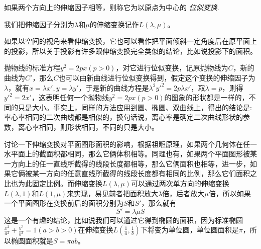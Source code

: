 如果两个方向上的伸缩因子相等，则称它为以原点为中心的 \emph{位似变换}.

我们把伸缩因子分别为$\lambda$和$\mu$的伸缩变换记作$L(\lambda, \mu)$。

如果以空间的视角来看伸缩变换，它也可以看作把平面倾斜一定角度后在原平面上的投影，所以关于投影有许多跟伸缩变换完全类似的结论，比如说投影下的面积。

\begin{example}[二次曲线的离心率决定其形状]
  抛物线的标准方程$y^2=2px(p>0)$，对它进行位似变换，记原抛物线为$C$，新的曲线为$C'$，那么$C$也可以由新曲线进行位似变换得到，假定这个变换的伸缩因子为$\lambda$，就有$x=\lambda x', y=\lambda y'$，于是新的曲线方程是$\lambda^2y'^2=2p\lambda x'$，取$\lambda = p$，则得$y'^2=2x'$，这表明任何一个抛物线$y^2=2px(p>0)$的图象的形状都是一样的，不同的只是大小。事实上，同样的方法应用到圆、椭圆、双曲线上，得出的结论是: 率心率相同的二次曲线都是相似的，换句话说，离心率是确定二次曲线形状的参数，离心率相同，则形状相同，不同的只是大小。
\end{example}

\begin{example}
  讨论一下伸缩变换对平面图形面积的影响，根据祖暅原理，如果两个几何体在任一水平面上的截面积都相同，那么它俩体积相等。同理也有，如果两个平面图形被某一方向上的任一直线所截得的线段长度都相等，那么它俩面积也相等，进一步，如果它俩被某一方向的任意直线所截得的线段长度都有相同的比例，那么它们面积之比也为此固定比例。而伸缩变换$L(\lambda, \mu)$可以通过两次单方向的伸缩变换$L(\lambda, 1)$和$L(1, \mu)$来实现，易见前者把面积放大$\lambda$倍，后者放大$\mu$倍，所以如果一个平面图形在变换前后的面积分别为$S$和$S'$，那么就有
  \begin{equation}
    \label{eq:area-for-scale-translation}
  S'=\lambda \mu S
  \end{equation}
这是一个有趣的结论，比如说我们可以通过它得到椭圆的面积，因为标准椭圆$\frac{x^2}{a^2}+\frac{y^2}{b^2}=1(a>b>0)$在伸缩变换$L(\frac{1}{a}, \frac{1}{b})$下将变为单位圆，单位圆面积是$\pi$，所以椭圆面积就是$S=\pi a b$。
\end{example}

